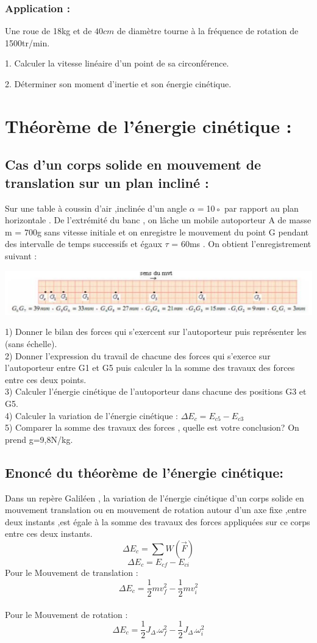\documentclass[12pt]{article}
\begin{document}
\subsubsection{Application : }
Une roue de 18kg et de $40cm$ de diamètre tourne à la fréquence de
rotation de 1500tr/min.

1. Calculer la vitesse linéaire d’un point de sa circonférence.

2. Déterminer son moment d’inertie et son énergie cinétique.

\section{Théorème de l’énergie cinétique : }
\subsection{Cas d’un corps solide en mouvement de translation sur un plan
incliné : }
Sur une table à coussin d’air ,inclinée d’un angle $\alpha = $10◦ par rapport au plan horizontale . De l’extrémité du banc , on
lâche un mobile autoporteur A de
masse m = 700g sans vitesse
initiale et on enregistre le mouvement du point G pendant des intervalle de temps successifs et égaux $\tau$ = 60ms . On obtient l’enregistrement suivant :
\begin{center}
\includegraphics[width=1\textwidth]{./img/img02.png}
\end{center}


1) Donner le bilan des forces qui s'exercent sur l'autoporteur puis représenter les (sans échelle).\\
2) Donner l'expression du travail de chacune des forces qui s'exerce sur l'autoporteur entre G1 et G5 puis calculer la la somme des travaux des forces entre ces deux points.\\
3) Calculer l'énergie cinétique de l'autoporteur dans chacune des positions G3 et G5.\\
4) Calculer la variation de l'énergie cinétique : $\Delta E_c = E_{c5} - E_{c3} $\\
5) Comparer la somme des travaux des forces , quelle est votre conclusion? On prend g=9,8N/kg.

\subsection{Enoncé du théorème de l'énergie cinétique: }
Dans un repère Galiléen , la variation de l'énergie cinétique d'un corps solide en mouvement translation ou en mouvement de rotation autour d'un axe fixe ,entre deux instants ,est égale à la somme des travaux des forces appliquées sur ce corps entre ces deux instants.
$$\Delta E_c = \sum W(\vec{F})$$
$$\Delta E_c = E_{cf} - E_{ci}$$
Pour le Mouvement  de translation :  $$\Delta E_c = \frac{1}{2}mv_f^2 - \frac{1}{2}mv_i^2$$
\\Pour le Mouvement  de rotation    :  $$\Delta E_c = \frac{1}{2}J_{\Delta}.\omega^2_f - \frac{1}{2}J_{\Delta}.\omega^2_i$$
\end{document}
